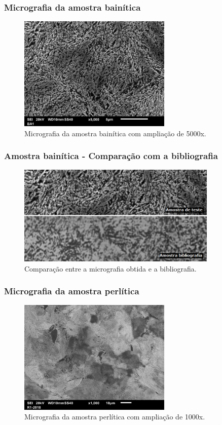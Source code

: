 \documentclass{beamer}
\begin{document}
\begin{frame}
\frametitle{Micrografia da amostra bainítica}
\begin{figure}
	\centering
	\includegraphics[width=0.65\textwidth]{bainita_top}
	\caption{Micrografia da amostra bainítica com ampliação de 5000x.}
	\label{fig:bainita_top}
\end{figure}
\end{frame}


\begin{frame}
\frametitle{Amostra bainítica - Comparação com a bibliografia}
\begin{figure}
	\centering
	\includegraphics[width=0.85\textwidth]{comparacao_bainita}
	\caption{Comparação entre a micrografia obtida e a bibliografia.}
	\label{fig:comparacao_bainita}
\end{figure}
\end{frame}

\begin{frame}
\frametitle{Micrografia da amostra perlítica}
\begin{figure}
	\centering
	\includegraphics[width=0.65\textwidth]{perlita_top}
	\caption{Micrografia da amostra perlítica com ampliação de 1000x.}
	\label{fig:perlita_top}
\end{figure}
\end{frame}
\end{document}
